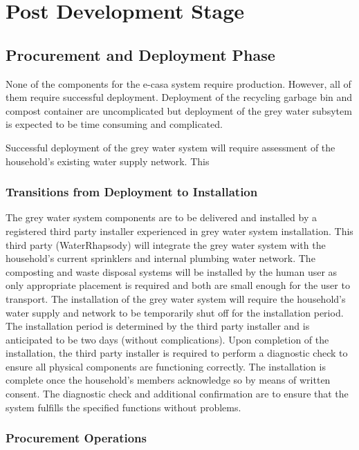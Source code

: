 \documentclass[a4paper,11pt,fleqn]{report}
\begin{document}
\chapter{Post Development Stage}

\section{Procurement and Deployment Phase}
None of the components for the \ac{e-casa} system require production. However, all of them require successful deployment. Deployment of the recycling garbage bin and compost container are uncomplicated but deployment of the grey water subsytem is expected to be time consuming and complicated. 

Successful deployment of the grey water system will require assessment of the household's existing water supply network. This 

\subsection{Transitions from Deployment to Installation}
The grey water system components are to be delivered and installed by a registered third party installer experienced in grey water system installation. This third party (WaterRhapsody) will integrate the grey water system with the household's current sprinklers and internal plumbing water network. The composting and waste disposal systems will be installed by the human user as only appropriate placement is required and both are small enough for the user to transport. The installation of the grey water system will require the household's water supply and network to be temporarily shut off for the installation period. The installation period is determined by the third party installer and is anticipated to be two days (without complications).  Upon completion of the installation, the third party installer is required to perform a diagnostic check to ensure all physical components are functioning correctly. The installation is complete once the household's members acknowledge so by means of written consent. The diagnostic check and additional confirmation are to ensure that the system fulfills the specified functions without problems.

\subsection{Procurement Operations}
\end{document}
